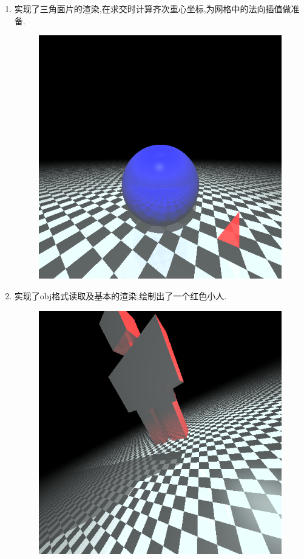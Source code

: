 \begin{enumerate}
\item 实现了三角面片的渲染,在求交时计算齐次重心坐标,为网格中的法向插值做准备.
\begin{figure}[H]
  \centering
  \includegraphics[scale=0.4]{img/face.png}
  \caption*{\label{fig:face}}
\end{figure}

\item 实现了obj格式读取及基本的渲染,绘制出了一个红色小人.
\begin{figure}[H]
  \centering
  \includegraphics[scale=0.4]{img/human.png}
  \caption*{\label{fig:human}}
\end{figure}


\end{enumerate}
